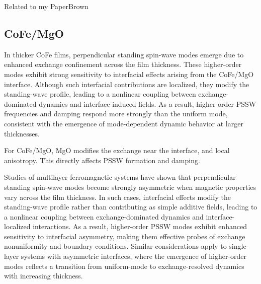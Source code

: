 \begin{physicsmodule}{Related to my Paper}{Brown}
  \begin{lawbox}
    \subsection*{\sffamily\bfseries CoFe/MgO}
     In thicker CoFe films, perpendicular standing spin-wave modes emerge due to enhanced exchange confinement across the film thickness. These higher-order modes exhibit strong sensitivity to interfacial effects arising from the CoFe/MgO interface. Although such interfacial contributions are localized, they modify the standing-wave profile, leading to a nonlinear coupling between exchange-dominated dynamics and interface-induced fields. As a result, higher-order PSSW frequencies and damping respond more strongly than the uniform mode, consistent with the emergence of mode-dependent dynamic behavior at larger thicknesses.

     For CoFe/MgO, MgO modifies the exchange near the interface, and local anisotropy. This directly affects PSSW formation and damping.

     Studies of multilayer ferromagnetic systems have shown that perpendicular standing spin-wave modes become strongly asymmetric when magnetic properties vary across the film thickness. In such cases, interfacial effects modify the standing-wave profile rather than contributing as simple additive fields, leading to a nonlinear coupling between exchange-dominated dynamics and interface-localized interactions. As a result, higher-order PSSW modes exhibit enhanced sensitivity to interfacial asymmetry, making them effective probes of exchange nonuniformity and boundary conditions. Similar considerations apply to single-layer systems with asymmetric interfaces, where the emergence of higher-order modes reflects a transition from uniform-mode to exchange-resolved dynamics with increasing thickness.
  \end{lawbox}
\end{physicsmodule}
